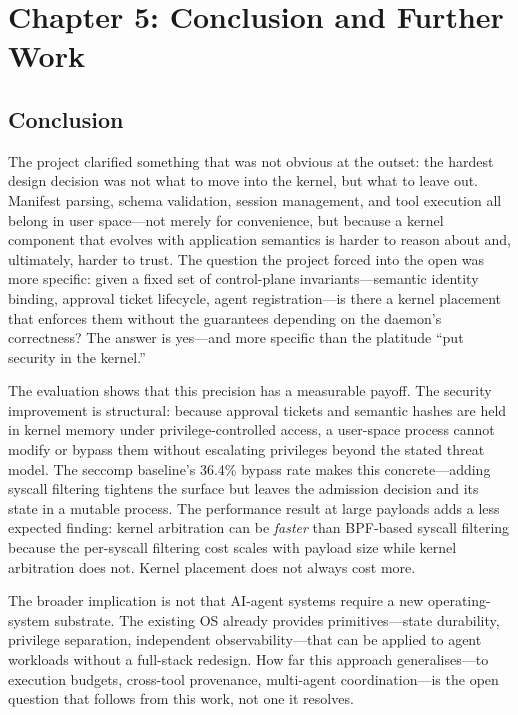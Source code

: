 \section*{Chapter 5: Conclusion and Further Work}
 \setcounter{section}{5} \setcounter{subsection}{0}

\subsection{Conclusion}

The project clarified something that was not obvious at the outset: the hardest design decision was not what to move into the kernel, but what to leave out.
Manifest parsing, schema validation, session management, and tool execution all belong in user space---not merely for convenience, but because a kernel component that evolves with application semantics is harder to reason about and, ultimately, harder to trust.
The question the project forced into the open was more specific: given a fixed set of control-plane invariants---semantic identity binding, approval ticket lifecycle, agent registration---is there a kernel placement that enforces them without the guarantees depending on the daemon's correctness?
The answer is yes---and more specific than the platitude ``put security in the kernel.''

The evaluation shows that this precision has a measurable payoff.
The security improvement is structural: because approval tickets and semantic hashes are held in kernel memory under privilege-controlled access, a user-space process cannot modify or bypass them without escalating privileges beyond the stated threat model.
The seccomp baseline's 36.4\% bypass rate makes this concrete---adding syscall filtering tightens the surface but leaves the admission decision and its state in a mutable process.
The performance result at large payloads adds a less expected finding: kernel arbitration can be \emph{faster} than BPF-based syscall filtering because the per-syscall filtering cost scales with payload size while kernel arbitration does not.
Kernel placement does not always cost more.

The broader implication is not that AI-agent systems require a new operating-system substrate.
The existing OS already provides primitives---state durability, privilege separation, independent observability---that can be applied to agent workloads without a full-stack redesign.
How far this approach generalises---to execution budgets, cross-tool provenance, multi-agent coordination---is the open question that follows from this work, not one it resolves.

